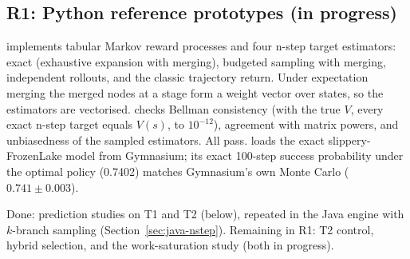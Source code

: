 \documentclass[11pt]{article}
\begin{document}
\subsection{R1: Python reference prototypes (in progress)}
 implements tabular Markov reward processes and four n-step target estimators: exact
(exhaustive expansion with merging), budgeted sampling with merging, independent rollouts, and the classic trajectory
return. Under expectation merging the merged nodes at a stage form a weight vector over states, so the estimators are
vectorised.  checks Bellman consistency (with the true $V$, every exact n-step target
equals $V(s)$, to $10^{-12}$), agreement with matrix powers, and unbiasedness of the sampled estimators. All pass.
 loads the exact slippery-FrozenLake model from Gymnasium; its exact 100-step success
probability under the optimal policy (0.7402) matches Gymnasium's own Monte Carlo ($0.741\pm0.003$).

Done: prediction studies on T1 and T2 (below), repeated in the Java engine with $k$-branch sampling
(Section~\ref{sec:java-nstep}). Remaining in R1: T2 control, hybrid selection, and the work-saturation study (both
in progress).




\end{document}

